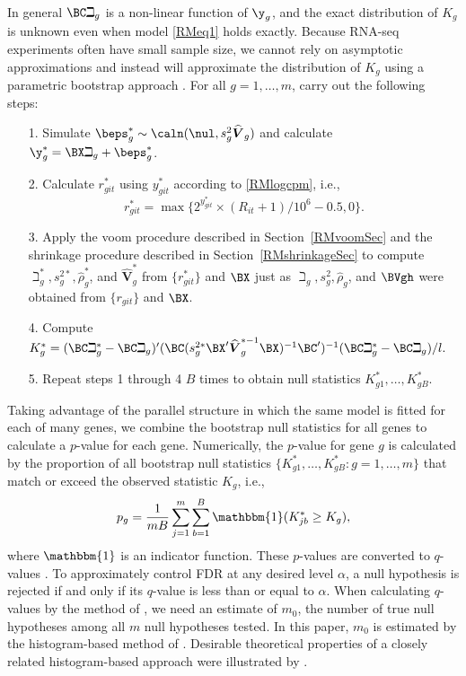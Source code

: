 In general $\BC \beth_g$ is a non-linear function of $\y_g$,  and the exact distribution of $K_g$ is unknown even when model \eqref{RMeq1} holds exactly. Because RNA-seq experiments often have small sample size,  we cannot rely on asymptotic approximations  and instead will approximate the distribution of $K_g$ using a parametric bootstrap approach \citep{efron1993}. 
For all $g = 1, \dots, m$, carry out the following steps:
\begin{itemize}
\item[1.] Simulate  $\beps_g^* \sim \caln(\nul, s^2_g\widehat{\boldsymbol{V}}_g)$ and calculate $\y^*_g = \BX\beth_g + \beps_g^* $.
\item[2.] Calculate $r_{git}^*$ using $y_{git}^*$ according to \eqref{RMlogcpm}, i.e.,
\[
r_{git}^* = \max\{2^{y_{git}^*}\times(R_{it}+1)/10^6-0.5, 0\}.
\]
\item[3.] Apply the voom procedure described in Section~\ref{RMvoomSec} and the shrinkage procedure described in Section~\ref{RMshrinkageSec} to  compute $\beth_g^*, s_g^{2*}, \widehat{\rho}_g^*$, and $\widehat{\boldsymbol{V}}_g^*$ from $\{r_{git}^*\}$ and $\BX$
just as  $\beth_g, s_g^{2}, \widehat{\rho}_g$, and $\BVgh$ were obtained from  $\{r_{git}\}$ and $\BX$.
\item[4.] Compute
$
K_g^* = (\BC \beth_g^* -\BC \beth_g)'(\BC (s_g^{2*}\BX'\widehat{\boldsymbol{V}}_g^{*-1}\BX )^{-1}\BC')^{-1}(\BC\beth_g^* -\BC\beth_g) /l.
$
\item[5.] Repeat steps 1 through 4 $B$ times to obtain  null statistics $K_{g1}^*, \dots, K_{gB}^*$.
 \end{itemize}
Taking  advantage of the parallel structure in which the same model is fitted for each of many genes, 
we  combine  the bootstrap null statistics for all genes to calculate a $p$-value for each gene. Numerically, the $p$-value for  gene $g$ is calculated by the proportion of all bootstrap null statistics  $\{K_{g1}^*, \dots, K_{gB}^*: g = 1, \dots, m\}$  that match or exceed the observed statistic $K_{g}$, i.e.,
\begin{equation}\label{RMeq5}
p_g = \frac{1}{mB} \sum_{j = 1}^m\sum_{b = 1}^B \mathbbm{1}(K^*_{jb} \geq K_{g}),
\end{equation}
where $\mathbbm{1}$ is an indicator function. These $p$-values are converted to $q$-values \citep{storey2002}. To approximately control FDR at any desired level $\alpha$, a null hypothesis is rejected if and only if its $q$-value is less than or equal to $\alpha$. When calculating $q$-values by the method of \cite{storey2002}, we need an estimate of $m_0$, the number of true null hypotheses among all $m$ null hypotheses tested. In this paper, $m_0$ is estimated by the histogram-based method of \cite{nettleton2006}.  Desirable theoretical properties of a closely related histogram-based approach were illustrated by \citet{liang2012}.

